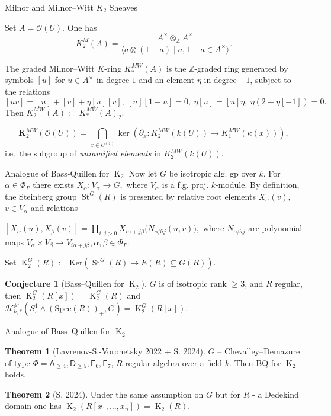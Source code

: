 \documentclass[handout]{beamer} %
\DeclareMathOperator{\K}{K}
\DeclareMathOperator{\St}{St}
\theoremstyle{definition}
\newtheorem*{thm}{Theorem}
\newtheorem*{conj}{Conjecture}
\begin{document}
\begin{frame}{Milnor and Milnor--Witt $K_2$ Sheaves}

Set $A = \mathcal{O}(U)$. One has \[ K_2^M(A) = \frac{A^\times \otimes_{\mathbb Z} A^\times}
{\langle a \otimes (1-a) \mid a,1-a \in A^\times \rangle}. \]
\pause

The graded Milnor--Witt $K$-ring $K_*^{MW}(A)$ is the $\mathbb Z$-graded ring
generated by symbols $[u]$ for $u\in A^\times$ in degree $1$ and an element
$\eta$ in degree $-1$, subject to the relations
\[
[uv]=[u]+[v]+\eta[u][v],\
[u][1-u]=0,\
\eta[u]=[u]\eta,\
\eta(2+\eta[-1])=0.
\]
\pause
Then
\( K_2^{MW}(A) := K_*^{MW}(A)_2. \)
\pause

\[ \mathbf{K}_2^{MW}(\mathcal{O}(U)) = \bigcap_{x\in U^{(1)}} \ker\!\left( \partial_x : K_2^{MW}(k(U)) \to K_1^{MW}(\kappa(x)) \right), \]
i.e.\ the subgroup of \emph{unramified elements} in $K_2^{MW}(k(U))$.
\end{frame}

\begin{frame}{Analogue of Bass-Quillen for $\K_2$}
Now let $G$ be isotropic alg. gp over $k$. For $\alpha \in \Phi_P$ there exists \( X_\alpha : V_\alpha \to G, \) where $V_\alpha$ is a f.g. proj. $k$-module.
\pause
By definition, the Steinberg group $\St^G(R)$ is presented by  relative root elements $X_\alpha(v)$, $v \in V_\alpha$ and relations

\( [X_\alpha(u),X_\beta(v)] = \prod_{i,j>0} X_{i\alpha+j\beta}\big(N_{\alpha\beta ij}(u,v)\big), \)
where $N_{\alpha\beta ij}$ are polynomial maps \( V_\alpha \times V_\beta \to V_{i\alpha+j\beta}, \alpha,\beta \in \Phi_P.\)
\pause

Set $\K_2^G(R) := \mathrm{Ker}(\St^G(R) \to E(R) \subseteq G(R))$.
\pause

 \begin{conj}[Bass--Quillen for $\K_2$] $G$ is of isotropic rank $\geq 3$, and $R$ regular, then $\K_2^G(R[x]) = \K_2^G(R)$ and
 $\mathcal{H}_{k,*}^{\mathbb{A}^1}(S^1_s \wedge (\mathrm{Spec}(R))_+, G) = \K_2^G(R[x])$. \end{conj}
\end{frame}

\begin{frame}{Analogue of Bass--Quillen for $\K_2$}
\begin{thm}[Lavrenov-S.-Voronetsky 2022 + S. 2024]
 $G$ -- Chevalley--Demazure of type $\Phi = \mathsf{A}_{\geq 4}, \mathsf{D}_{\geq 5}, \mathsf{E}_6, \mathsf{E}_7$, $R$ regular algebra over a field $k$. Then BQ for $\K_2$ holds.
\end{thm}
\pause

\begin{thm}[S. 2024] Under the same assumption on $G$ but for $R$ - a Dedekind domain one has $\K_2(R[x_1, \ldots, x_n]) = \K_2(R)$.
\end{thm}
\end{frame}
\end{document}
